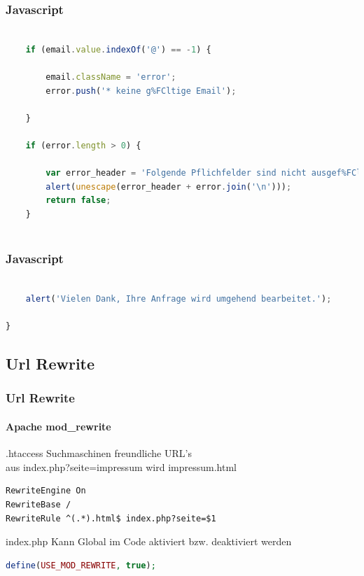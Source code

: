 \documentclass[xcolor=dvipsnames]{beamer}
\begin{document}
\begin{frame}[fragile]
\frametitle{Javascript}

\begin{lstlisting}[language=javascript, firstnumber=42]

	if (email.value.indexOf('@') == -1) {

		email.className = 'error';
		error.push('* keine g%FCltige Email');

	}

	if (error.length > 0) {

		var error_header = 'Folgende Pflichfelder sind nicht ausgef%FCllt:\n\n';
		alert(unescape(error_header + error.join('\n')));
		return false;
	}
	
\end{lstlisting}
\end{frame}

\begin{frame}[fragile]
\frametitle{Javascript}

\begin{lstlisting}[language=javascript, firstnumber=56]
	
	alert('Vielen Dank, Ihre Anfrage wird umgehend bearbeitet.');

}

\end{lstlisting}
\end{frame}



\subsection{Url Rewrite}
\begin{frame}[fragile]
  \frametitle{Url Rewrite}
  \framesubtitle{Apache mod\_rewrite} %

 \begin{block}{.htaccess}
	Suchmaschinen freundliche URL's \\
	aus index.php?seite=impressum wird impressum.html
  \end{block}

\begin{lstlisting}[language=HTML]
RewriteEngine On
RewriteBase /
RewriteRule ^(.*).html$ index.php?seite=$1
\end{lstlisting}

  \begin{block}{index.php}
	Kann Global im Code aktiviert bzw. deaktiviert werden
  \end{block}

\begin{lstlisting}[language=PHP, firstnumber=4]
define(USE_MOD_REWRITE, true);

\end{lstlisting}
\end{frame}
\end{document}
